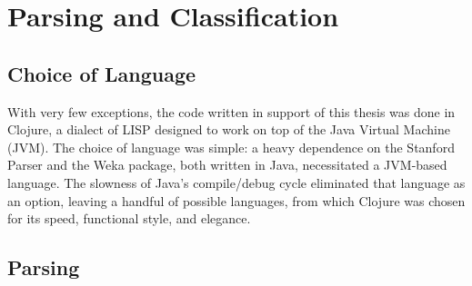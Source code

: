 \documentclass[main.tex]{subfiles}
\begin{document}
\section{Parsing and Classification}
\setcounter{section}{4}
\subsection{Choice of Language}

With very few exceptions, the code written in support of this thesis was done in Clojure, a dialect of LISP designed to work on top of the Java Virtual Machine (JVM). The choice of language was simple: a heavy dependence on the Stanford Parser and the Weka package, both written in Java, necessitated a JVM-based language. The slowness of Java's compile/debug cycle eliminated that language as an option, leaving a handful of possible languages, from which Clojure was chosen for its speed, functional style, and elegance.

\subsection{Parsing}
\label{subsec:parsing}
\end{document}
